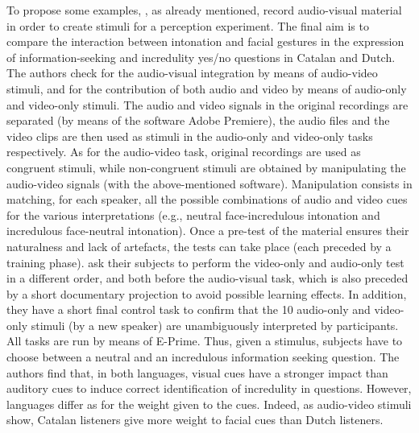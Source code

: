 \documentclass[output=paper]{langsci/langscibook}
\begin{document}
To propose some examples,  \citet{CrespoSendra2013}, as already mentioned, record audio-visual material in order to create stimuli for a perception experiment. The final aim is to compare the interaction between intonation and facial gestures in the expression of information-seeking and incredulity yes\slash no questions in Catalan and Dutch. The authors check for the audio-visual integration by means of audio-video stimuli, and for the contribution of both audio and video by means of audio-only and video-only stimuli. The audio and video signals in the original recordings are separated (by means of the software Adobe Premiere), the audio files and the video clips are then used as stimuli in the audio-only and video-only tasks respectively. As for the audio-video task, original recordings are used as congruent stimuli, while non-congruent stimuli are obtained by manipulating the audio-video signals (with the above-mentioned software). Manipulation consists in matching, for each speaker, all the possible combinations of audio and video cues for the various interpretations (e.g., neutral face-incredulous intonation and incredulous face-neutral intonation). Once  a pre-test of the material ensures their naturalness and lack of artefacts, the tests can take place (each preceded by a training phase).  \citet{CrespoSendra2013} ask their subjects to perform the video-only and audio-only test in a different order, and both before the audio-visual task, which is also preceded by a short documentary projection to avoid possible learning effects. In addition, they have a short final control task to confirm that the 10 audio-only and video-only stimuli (by a new speaker) are unambiguously interpreted by participants. All tasks are run by means of E-Prime. Thus, given a stimulus, subjects have to choose between a neutral and an incredulous information seeking question. The authors find that, in both languages, visual cues have a stronger impact than auditory cues to induce correct identification of incredulity in questions. However, languages differ as for the weight given to the cues. Indeed, as audio-video stimuli show, Catalan listeners give more weight to facial cues than Dutch listeners. 
\end{document}
